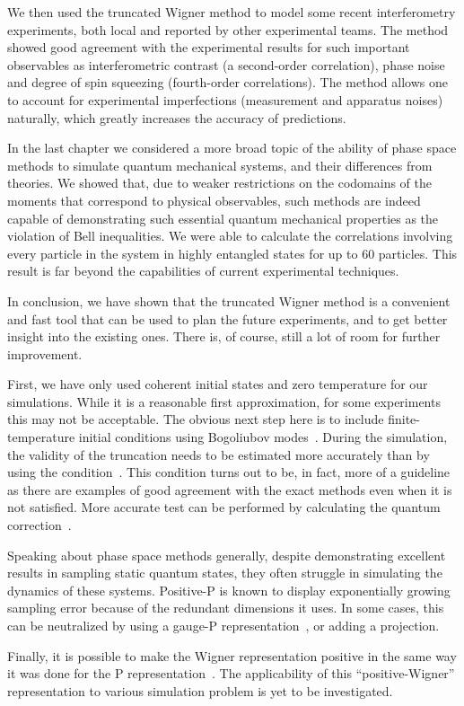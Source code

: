 We then used the truncated Wigner method to model some recent  interferometry experiments, both local and reported by other experimental teams.
The method showed good agreement with the experimental results for such important observables as interferometric contrast (a second-order correlation), phase noise and degree of spin squeezing (fourth-order correlations).
The method allows one to account for experimental imperfections (measurement and apparatus noises) naturally, which greatly increases the accuracy of predictions.

In the last chapter we considered a more broad topic of the ability of phase space methods to simulate quantum mechanical systems, and their differences from  theories.
We showed that, due to weaker restrictions on the codomains of the moments that correspond to physical observables, such methods are indeed capable of demonstrating such essential quantum mechanical properties as the violation of Bell inequalities.
We were able to calculate the correlations involving every particle in the system in highly entangled  states for up to $60$ particles.
This result is far beyond the capabilities of current experimental techniques.

\centerline{\asterism}

In conclusion, we have shown that the truncated Wigner method is a convenient and fast tool that can be used to plan the future experiments, and to get better insight into the existing ones.
There is, of course, still a lot of room for further improvement.

First, we have only used coherent initial states and zero temperature for our simulations.
While it is a reasonable first approximation, for some experiments this may not be acceptable.
The obvious next step here is to include finite-temperature initial conditions using Bogoliubov modes~\cite{Steel1998,Sinatra2002,Ruostekoski2005,Isella2006,Blakie2008}.
During the simulation, the validity of the truncation needs to be estimated more accurately than by using the condition~.
This condition turns out to be, in fact, more of a guideline as there are examples of good agreement with the exact methods even when it is not satisfied.
More accurate test can be performed by calculating the quantum correction~\cite{Polkovnikov2010}.

Speaking about phase space methods generally, despite demonstrating excellent results in sampling static quantum states, they often struggle in simulating the dynamics of these systems.
Positive-P is known to display exponentially growing sampling error because of the redundant dimensions it uses.
In some cases, this can be neutralized by using a gauge-P representation~\cite{Deuar2002,Deuar2005a}, or adding a projection.

Finally, it is possible to make the Wigner representation positive in the same way it was done for the P representation~\cite{Plimak2001}.
The applicability of this ``positive-Wigner'' representation to various simulation problem is yet to be investigated.
